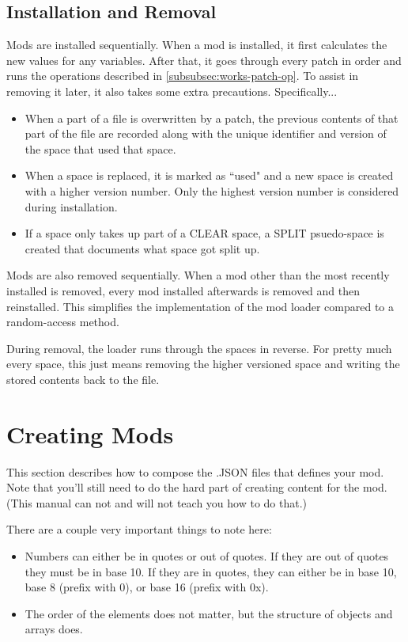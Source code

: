 \documentclass[12pt,a4paper,notitlepage]{article}
\begin{document}
\subsection{Installation and Removal}
Mods are installed sequentially. When a mod is installed, it first calculates the new values for any variables. After that, it goes through every patch in order and runs the operations described in \ref{subsubsec:works-patch-op}. To assist in removing it later, it also takes some extra precautions. Specifically...

\begin{itemize}
    \item When a part of a file is overwritten by a patch, the previous contents of that part of the file are recorded along with the unique identifier and version of the space that used that space.
    \item When a space is replaced, it is marked as ``used" and a new space is created with a higher version number. Only the highest version number is considered during installation.
    \item If a space only takes up part of a CLEAR space, a SPLIT psuedo-space is created that documents what space got split up.
\end{itemize}

Mods are also removed sequentially. When a mod other than the most recently installed is removed, every mod installed afterwards is removed and then reinstalled. This simplifies the implementation of the mod loader compared to a random-access method.

During removal, the loader runs through the spaces in reverse. For pretty much every space, this just means removing the higher versioned space and writing the stored contents back to the file.

\pagebreak
\section{Creating Mods}
\label{sec:create}
This section describes how to compose the .JSON files that defines your mod. Note that you'll still need to do the hard part of creating content for the mod. (This manual can  not and will not teach you how to do that.)

There are a couple very important things to note here:

\begin{itemize}
    \item Numbers can either be in quotes or out of quotes. If they are out of quotes they must be in base 10. If they are in quotes, they can either be in base 10, base 8 (prefix with 0), or base 16 (prefix with 0x).
    \item The order of the elements does not matter, but the structure of objects and arrays does.
\end{itemize}
\end{document}
